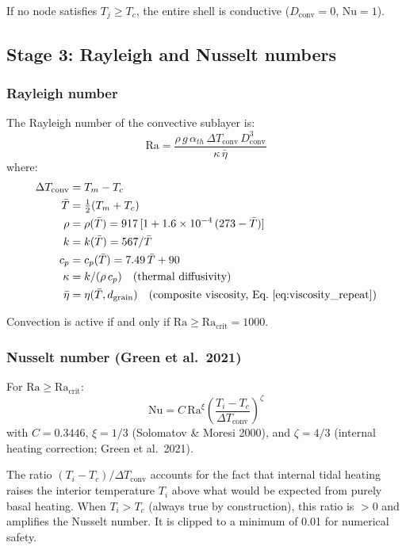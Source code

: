 \documentclass[11pt,a4paper]{article}
\newcommand{\Ra}{\mathrm{Ra}}
\newcommand{\Nu}{\mathrm{Nu}}
\begin{document}
If no node satisfies $T_j \geq T_c$, the entire shell is conductive
($D_{\mathrm{conv}} = 0$, $\Nu = 1$).

\subsection{Stage 3: Rayleigh and Nusselt numbers}

\subsubsection{Rayleigh number}

The Rayleigh number of the convective sublayer is:
\begin{equation}
\Ra = \frac{\rho\,g\,\alpha_{th}\,\Delta T_{\mathrm{conv}}\,
  D_{\mathrm{conv}}^3}{\kappa\,\bar{\eta}}
\label{eq:Ra}
\end{equation}
where:
\begin{align}
\Delta T_{\mathrm{conv}} &= T_m - T_c \\
\bar{T} &= \tfrac{1}{2}(T_m + T_c) \\
\rho &= \rho(\bar{T}) = 917\,[1 + 1.6\times10^{-4}\,(273 - \bar{T})] \\
k &= k(\bar{T}) = 567/\bar{T} \\
c_p &= c_p(\bar{T}) = 7.49\,\bar{T} + 90 \\
\kappa &= k/(\rho\,c_p) \quad\text{(thermal diffusivity)} \\
\bar{\eta} &= \eta(\bar{T}, d_{\mathrm{grain}})
  \quad\text{(composite viscosity, Eq.~\ref{eq:viscosity_repeat})}
\end{align}

Convection is active if and only if $\Ra \geq \Ra_{\mathrm{crit}} = 1000$.

\subsubsection{Nusselt number (Green et al.\ 2021)}

For $\Ra \geq \Ra_{\mathrm{crit}}$:
\begin{equation}
\boxed{\Nu = C\,\Ra^{\xi}\left(\frac{T_i - T_c}
  {\Delta T_{\mathrm{conv}}}\right)^{\!\zeta}}
\label{eq:Nu_green}
\end{equation}
with $C = 0.3446$, $\xi = 1/3$ (Solomatov \& Moresi 2000), and
$\zeta = 4/3$ (internal heating correction; Green et al.\ 2021).

The ratio $(T_i - T_c)/\Delta T_{\mathrm{conv}}$ accounts for the
fact that internal tidal heating raises the interior temperature $T_i$
above what would be expected from purely basal heating. When
$T_i > T_c$ (always true by construction), this ratio is $> 0$ and
amplifies the Nusselt number. It is clipped to a minimum of 0.01
for numerical safety.
\end{document}
